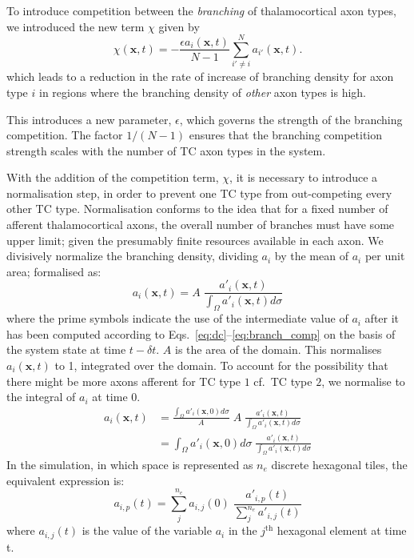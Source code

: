 \documentclass[a4paper,11pt]{article}
\newcommand{\e}{\emph}
\newcommand{\mb}[1]{\mathbf{#1}}
\begin{document}
To introduce competition between the \emph{branching} of thalamocortical axon
types, we introduced the new term $\chi$ given by
%
\begin{equation} \label{eq:branch_comp}
\chi(\mb{x}, t) = - \frac{\epsilon  a_i(\mb{x}, t)}{N-1} \sum_{i' \ne i}^{N} a_{i'}(\mb{x}, t).
\end{equation}
%
which leads to a reduction in the rate of increase of branching density for
axon type $i$ in regions where the branching density of \e{other} axon types
is high.

This introduces a new parameter, $\epsilon$, which governs the strength of the
branching competition. The factor $1/(N-1)$ ensures that the branching
competition strength scales with the number of TC axon types in the system.

With the addition of the competition term, $\chi$, it is necessary to
introduce a normalisation step, in order to prevent one TC type from
out-competing every other TC type. Normalisation conforms to the idea that for
a fixed number of afferent thalamocortical axons, the overall number of
branches must have some upper limit; given the presumably finite resources
available in each axon. We divisively normalize the branching density,
dividing $a_i$ by the mean of $a_i$ per unit area; formalised as:
%
\begin{equation} \label{eq:norm}
a_i(\mathbf{x}, t) = A \; \frac {a'_i(\mathbf{x}, t)} {\int_\Omega a'_i(\mathbf{x}, t) d\sigma}
\end{equation}
%
where the prime symbols indicate the use of the intermediate value of $a_i$
after it has been computed according to Eqs.~\ref{eq:dc}--\ref{eq:branch_comp}
on the basis of the system state at time $t-{\delta}t$. $A$ is the area of the
domain. This normalises $a_i(\mathbf{x}, t)$ to 1, integrated over the domain. To
account for the possibility that there might be more axons afferent for TC
type $1$ cf.~TC type $2$, we normalise to the integral of $a_i$ at time 0.
%
\begin{equation} \label{eq:norm_time0}
\begin{split}
a_i(\mathbf{x}, t) & =
\frac{\int_\Omega  a'_i(\mathbf{x}, 0) d\sigma}{A} \; A \; \frac {a'_i(\mathbf{x}, t)} {\int_\Omega
  a'_i(\mathbf{x}, t) d\sigma} \\
%
& = \int_\Omega  a'_i(\mathbf{x}, 0) d\sigma \; \frac {a'_i(\mathbf{x}, t)} {\int_\Omega
  a'_i(\mathbf{x}, t) d\sigma}
\end{split}
\end{equation}
%
In the simulation, in which space is represented as $n_e$ discrete
hexagonal tiles, the equivalent expression is:
%
\begin{equation} \label{eq:norm_discrete}
{a_{i,p}}(t) = \textstyle \sum_j^{n_e} a_{i,j}(0) \; \frac {a'_{i,p}(t)} {\textstyle \sum_j^{n_e} a'_{i,j}(t) }
\end{equation}
%
where $a_{i,j}(t)$ is the value of the variable $a_i$ in the $j^{\mathrm{th}}$
hexagonal element at time t.
\end{document}
